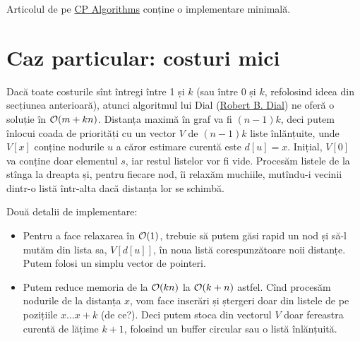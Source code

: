 \documentclass[../main.tex]{subfiles}
\begin{document}
Articolul de pe \href{https://cp-algorithms.com/graph/01_bfs.html}{CP Algorithms} conține o implementare minimală.

\section{Caz particular: costuri mici}

Dacă toate costurile sînt întregi între 1 și $k$ (sau între 0 și $k$, refolosind ideea din secțiunea anterioară), atunci algoritmul lui Dial (\href{https://www.researchgate.net/profile/Robert-Dial}{Robert B. Dial}) ne oferă o soluție în $\mathcal{O}(m + kn)$. Distanța maximă în graf va fi $(n-1)k$, deci putem înlocui coada de priorități cu un vector $V$ de $(n-1)k$ liste înlănțuite, unde $V[x]$ conține nodurile $u$ a căror estimare curentă este $d[u] = x$. Inițial, $V[0]$ va conține doar elementul $s$, iar restul listelor vor fi vide. Procesăm listele de la stînga la dreapta și, pentru fiecare nod, îi relaxăm muchiile, mutîndu-i vecinii dintr-o listă într-alta dacă distanța lor se schimbă.

Două detalii de implementare:

\begin{itemize}
  \item Pentru a face relaxarea în $\mathcal{O}(1)$, trebuie să putem găsi rapid un nod și să-l mutăm din lista sa, $V[d[u]]$, în noua listă corespunzătoare noii distanțe. Putem folosi un simplu vector de pointeri.

  \item Putem reduce memoria de la $\mathcal{O}(kn)$ la $\mathcal{O}(k + n)$ astfel. Cînd procesăm nodurile de la distanța $x$, vom face inserări și ștergeri doar din listele de pe pozițiile $x \dots x + k$ (de ce?). Deci putem stoca din vectorul $V$ doar fereastra curentă de lățime $k + 1$, folosind un buffer circular sau o listă înlănțuită.
\end{itemize}
\end{document}
